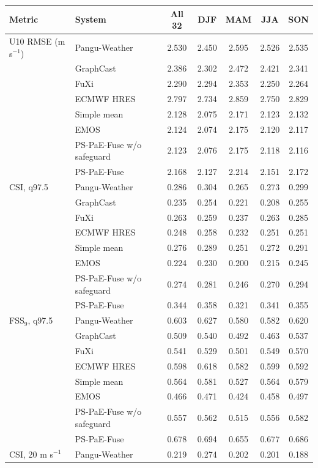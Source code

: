 \begin{tabular}{llccccc}
\hline
Metric & System & All 32 & DJF & MAM & JJA & SON \\
\hline
U10 RMSE (m s$^{-1}$) & Pangu-Weather & 2.530 & 2.450 & 2.595 & 2.526 & 2.535 \\
 & GraphCast & 2.386 & 2.302 & 2.472 & 2.421 & 2.341 \\
 & FuXi & 2.290 & 2.294 & 2.353 & 2.250 & 2.264 \\
 & ECMWF HRES & 2.797 & 2.734 & 2.859 & 2.750 & 2.829 \\
 & Simple mean & 2.128 & 2.075 & 2.171 & 2.123 & 2.132 \\
 & EMOS & 2.124 & 2.074 & 2.175 & 2.120 & 2.117 \\
 & PS-PaE-Fuse w/o safeguard & 2.123 & 2.076 & 2.175 & 2.118 & 2.116 \\
 & PS-PaE-Fuse & 2.168 & 2.127 & 2.214 & 2.151 & 2.172 \\[5pt]
CSI, q97.5 & Pangu-Weather & 0.286 & 0.304 & 0.265 & 0.273 & 0.299 \\
 & GraphCast & 0.235 & 0.254 & 0.221 & 0.208 & 0.255 \\
 & FuXi & 0.263 & 0.259 & 0.237 & 0.263 & 0.285 \\
 & ECMWF HRES & 0.248 & 0.258 & 0.232 & 0.251 & 0.251 \\
 & Simple mean & 0.276 & 0.289 & 0.251 & 0.272 & 0.291 \\
 & EMOS & 0.224 & 0.230 & 0.200 & 0.215 & 0.245 \\
 & PS-PaE-Fuse w/o safeguard & 0.274 & 0.281 & 0.246 & 0.270 & 0.294 \\
 & PS-PaE-Fuse & 0.344 & 0.358 & 0.321 & 0.341 & 0.355 \\[5pt]
FSS$_9$, q97.5 & Pangu-Weather & 0.603 & 0.627 & 0.580 & 0.582 & 0.620 \\
 & GraphCast & 0.509 & 0.540 & 0.492 & 0.463 & 0.537 \\
 & FuXi & 0.541 & 0.529 & 0.501 & 0.549 & 0.570 \\
 & ECMWF HRES & 0.598 & 0.618 & 0.582 & 0.599 & 0.592 \\
 & Simple mean & 0.564 & 0.581 & 0.527 & 0.564 & 0.579 \\
 & EMOS & 0.466 & 0.471 & 0.424 & 0.458 & 0.497 \\
 & PS-PaE-Fuse w/o safeguard & 0.557 & 0.562 & 0.515 & 0.556 & 0.582 \\
 & PS-PaE-Fuse & 0.678 & 0.694 & 0.655 & 0.677 & 0.686 \\[5pt]
CSI, 20 m s$^{-1}$ & Pangu-Weather & 0.219 & 0.274 & 0.202 & 0.201 & 0.188 \\

\end{tabular}
